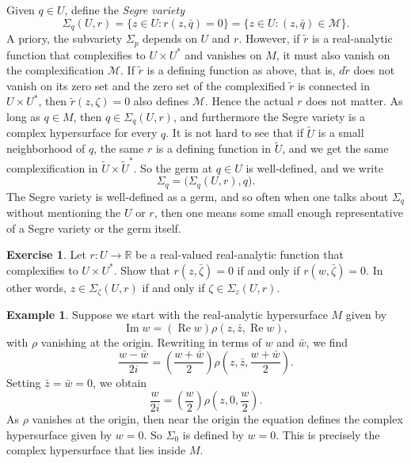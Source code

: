 \documentclass[12pt,openany]{book}
\renewcommand{\Re}{\operatorname{Re}}
\renewcommand{\Im}{\operatorname{Im}}
\newcommand{\R}{{\mathbb{R}}}
\newcommand{\sM}{{\mathscr{M}}}
\theoremstyle{plain}
\theoremstyle{remark}
\theoremstyle{definition}
\newenvironment{exbox}{%
    \def\FrameCommand{\vrule width 1pt \relax\hspace{10pt}}%
    \MakeFramed{\advance\hsize-\width\FrameRestore}%
}{%
    \endMakeFramed
}
\theoremstyle{exercise}
\newtheorem{exercise}{Exercise}[section]
\theoremstyle{example}
\newtheorem{example}[thm]{Example}
\begin{document}
Given $q \in U$,
define the \emph{Segre variety}
%
\begin{equation*}
\Sigma_q(U,r) =
\bigl\{ z \in U : r(z,\bar{q}) = 0 \bigr\} =
\bigl\{ z \in U : (z,\bar{q}) \in \sM \bigr\} .
\end{equation*}
A priory, the subvariety $\Sigma_p$ depends on $U$ and $r$.
However, if $\widetilde{r}$ is a
real-analytic function that complexifies to $U \times U^*$
and vanishes on $M$, it must also vanish on the complexification $\sM$.
If $\widetilde{r}$ is a defining function as above,
that is, $d\widetilde{r}$ does not vanish on its zero set
and the zero set of the complexified $\widetilde{r}$ is connected
in $U \times U^*$, then $\widetilde{r}(z,\zeta) = 0$ also
defines $\sM$.
Hence the actual $r$ does not matter.
As long as $q \in M$, then
$q \in \Sigma_q(U,r)$, and furthermore the
Segre variety is a complex hypersurface for every $q$.
It is not hard to see that
if $\widetilde{U}$ is a small neighborhood of $q$, the same $r$ is
a defining function in
$\widetilde{U}$, and we
get the same complexification in $\widetilde{U} \times \widetilde{U}^*$.
So the germ at $q \in U$ is well-defined, and we write
\begin{equation*}
\Sigma_q = \bigl( \Sigma_q(U,r) , q \bigr) .
\end{equation*}
The Segre variety is
well-defined as a germ, and so often when one talks about $\Sigma_q$
without mentioning the $U$ or $r$, then one means some small enough
representative of a Segre variety or the germ itself.

\begin{exbox}
\begin{exercise}
Let $r \colon U \to \R$ be a real-valued
real-analytic function that complexifies to
$U \times U^*$.  Show that
$r(z,\bar{\zeta}) = 0$
if and only if
$r(w,\bar{\zeta}) = 0$.  In other words,
$z \in \Sigma_{\zeta}(U,r)$ if and only if
$\zeta \in \Sigma_z(U,r)$.
\end{exercise}
\end{exbox}

\begin{example}
Suppose we start with the real-analytic hypersurface $M$ given by
\begin{equation*}
\Im w = (\Re w) \rho(z,\bar{z},\Re w) ,
\end{equation*}
with $\rho$ vanishing at the origin.
Rewriting in terms of $w$ and $\bar{w}$, we find
\begin{equation*}
\frac{w-\bar{w}}{2i} = \left(\frac{w+\bar{w}}{2}\right)
\rho\left(z,\bar{z},\frac{w+\bar{w}}{2}\right) .
\end{equation*}
Setting $\bar{z} = \bar{w} = 0$, we obtain
\begin{equation*}
\frac{w}{2i} = \left(\frac{w}{2}\right)
\rho\left(z,0,\frac{w}{2}\right) .
\end{equation*}
As $\rho$ vanishes at the origin, then near the origin the equation
defines the complex hypersurface given by $w=0$.
So $\Sigma_0$ is defined by $w = 0$.
This is precisely the complex hypersurface that lies inside $M$.
\end{example}
\end{document}
